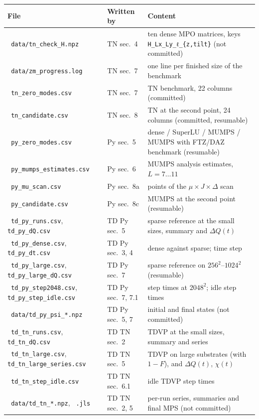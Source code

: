 \documentclass[11pt]{article}
\renewcommand{\code}[1]{\texttt{\hyphenchar\font=-1 #1}}
\begin{document}
\begin{center}
\small
\begin{tabularx}{\textwidth}{>{\raggedright}p{4.6cm}>{\raggedright}p{3.6cm}>{\raggedright\arraybackslash}X}
\toprule
File & Written by & Content\\
\midrule
\code{data/tn\_check\_H.npz} & TN sec.~4 & ten dense MPO matrices, keys \code{H\_Lx\_Ly\_ℓ\_\{z,tilt\}} (not committed)\\
\code{data/zm\_progress.log} & TN sec.~7 & one line per finished size of the benchmark\\
\code{tn\_zero\_modes.csv} & TN sec.~7 & TN benchmark, 22 columns (committed)\\
\code{tn\_candidate.csv} & TN sec.~8 & TN at the second point, 24 columns (committed, resumable)\\
\code{py\_zero\_modes.csv} & Py sec.~5 & dense / SuperLU / MUMPS / MUMPS with FTZ/DAZ benchmark (resumable)\\
\code{py\_mumps\_estimates.csv} & Py sec.~6 & MUMPS analysis estimates, $L = 7\dots11$\\
\code{py\_mu\_scan.csv} & Py sec.~8a & 1305 points of the $\mu\times J\times\Delta$ scan\\
\code{py\_candidate.csv} & Py sec.~8c & MUMPS at the second point (resumable)\\
\code{td\_py\_runs.csv}, \code{td\_py\_dQ.csv} & TD Py sec.~5 & sparse reference at the small sizes, summary and $\Delta Q(t)$\\
\code{td\_py\_dense.csv}, \code{td\_py\_dt.csv} & TD Py sec.~3, 4 & dense against sparse; time step\\
\code{td\_py\_large.csv}, \code{td\_py\_large\_dQ.csv} & TD Py sec.~7 & sparse reference on $256^2$--$1024^2$ (resumable)\\
\code{td\_py\_step2048.csv}, \code{td\_py\_step\_idle.csv} & TD Py sec.~7, 7.1 & step times at $2048^2$; idle step times\\
\code{data/td\_py\_psi\_*.npz} & TD Py sec.~5, 7 & initial and final states (not committed)\\
\code{td\_tn\_runs.csv}, \code{td\_tn\_dQ.csv} & TD TN sec.~2 & TDVP at the small sizes, summary and series\\
\code{td\_tn\_large.csv}, \code{td\_tn\_large\_series.csv} & TD TN sec.~5 & TDVP on large substrates (with $1-F$), and $\Delta Q(t)$, $\chi(t)$\\
\code{td\_tn\_step\_idle.csv} & TD TN sec.~6.1 & idle TDVP step times\\
\code{data/td\_tn\_*.npz}, \code{.jls} & TD TN sec.~2, 5 & per-run series, summaries and final MPS (not committed)\\

\end{tabularx}
\end{center}
\end{document}
